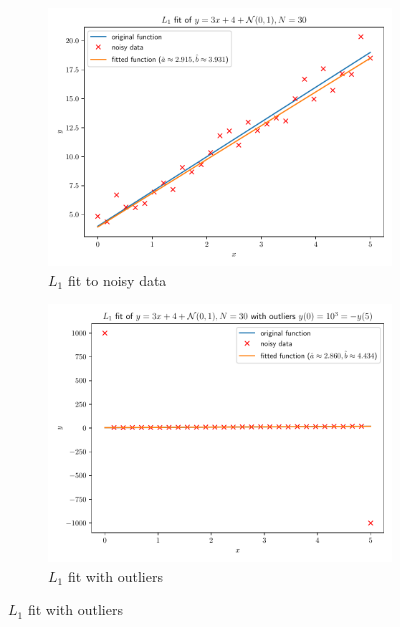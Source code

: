 \documentclass[oneside, a4paper]{book}
\begin{document}
\begin{figure}[H]
  \begin{subfigure}{0.5\textwidth}
    \centering
    \includegraphics[width=\linewidth]{linregl1.pdf}
    \caption{$L_1$ fit to noisy data}
    \label{fig:linregl1}
  \end{subfigure}%
  \begin{subfigure}{0.5\textwidth}
    \centering
    \includegraphics[width=\linewidth]{linregoutl1.pdf}
    \caption{$L_1$ fit with outliers}
    \label{fig:linregoutl1}
  \end{subfigure}

\end{figure}
\end{document}
